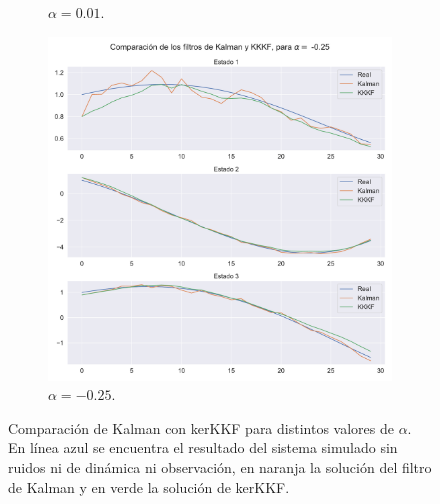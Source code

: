 \begin{figure}[h!]
\begin{subfigure}[b]{0.49\textwidth}
    \caption{$\alpha = 0.01$.}
    \label{fig:kalman_vs_kerKKF_001}
    \end{subfigure}
    \begin{subfigure}[b]{0.49\textwidth}
        \includegraphics[width=0.9\linewidth]{img/content/chapter4/kalman_vs_kerKKF_025.pdf}
    \caption{$\alpha = -0.25$.}
    \label{fig:kalman_vs_kerKKF_025}
    \end{subfigure}
    \caption{Comparación de Kalman con kerKKF para distintos valores de $\alpha$. En línea azul se encuentra el resultado del sistema simulado sin ruidos ni de dinámica ni observación, en naranja la solución del filtro de Kalman y en verde la solución de kerKKF.}
\end{figure}

